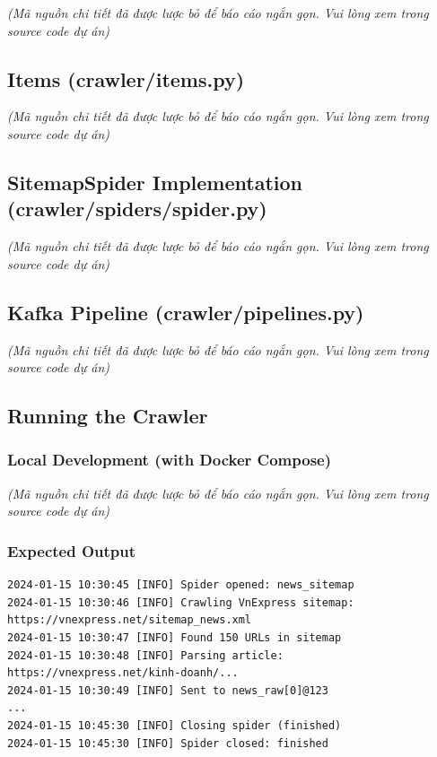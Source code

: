 \emph{(Mã nguồn chi tiết đã được lược bỏ để báo cáo ngắn gọn. Vui lòng
xem trong source code dự án)}

\hypertarget{items-crawleritems.py}{%
\subsection{Items (crawler/items.py)}}

\emph{(Mã nguồn chi tiết đã được lược bỏ để báo cáo ngắn gọn. Vui lòng
xem trong source code dự án)}

\hypertarget{sitemapspider-implementation-crawlerspidersspider.py}{%
\subsection{SitemapSpider Implementation
(crawler/spiders/spider.py)}}

\emph{(Mã nguồn chi tiết đã được lược bỏ để báo cáo ngắn gọn. Vui lòng
xem trong source code dự án)}

\hypertarget{kafka-pipeline-crawlerpipelines.py}{%
\subsection{Kafka Pipeline
(crawler/pipelines.py)}}

\emph{(Mã nguồn chi tiết đã được lược bỏ để báo cáo ngắn gọn. Vui lòng
xem trong source code dự án)}

\hypertarget{running-the-crawler}{%
\subsection{Running the Crawler}}

\hypertarget{local-development-with-docker-compose}{%
\subsubsection{Local Development (with Docker
Compose)}}

\emph{(Mã nguồn chi tiết đã được lược bỏ để báo cáo ngắn gọn. Vui lòng
xem trong source code dự án)}

\hypertarget{expected-output}{%
\subsubsection{Expected Output}}

\begin{verbatim}
2024-01-15 10:30:45 [INFO] Spider opened: news_sitemap
2024-01-15 10:30:46 [INFO] Crawling VnExpress sitemap: https://vnexpress.net/sitemap_news.xml
2024-01-15 10:30:47 [INFO] Found 150 URLs in sitemap
2024-01-15 10:30:48 [INFO] Parsing article: https://vnexpress.net/kinh-doanh/...
2024-01-15 10:30:49 [INFO] Sent to news_raw[0]@123
...
2024-01-15 10:45:30 [INFO] Closing spider (finished)
2024-01-15 10:45:30 [INFO] Spider closed: finished
\end{verbatim}

